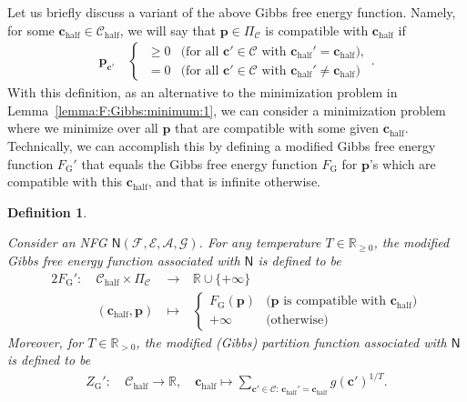 \documentclass[journal, twocolumn]{IEEEtran}
\renewcommand{\mathbf}[1]{{\bm{#1}}}
\renewcommand{\geq}{\geqslant}
\newcommand{\R}{\mathbb{R}}
\newcommand{\Rp}{\mathbb{R}_{\geq 0}}
\newcommand{\Rpp}{\mathbb{R}_{>0}}
\newcommand{\vect}[1]{\mathbf{#1}}
\newcommand{\code}[1]{\mathcal{#1}}
\newcommand{\set}[1]{\mathcal{#1}}
\newcommand{\graph}[1]{\mathsf{#1}}
\newcommand{\codeC}{\code{C}}
\newcommand{\codeCedge}{\code{C}}
\newcommand{\codeCedgehalf}{\code{C}_{\mathrm{half}}}
\newcommand{\setA}{\set{A}}
\newcommand{\setC}{\set{C}}
\newcommand{\setE}{\set{E}}
\newcommand{\setF}{\set{F}}
\newcommand{\setG}{\set{G}}
\newcommand{\vc}{\vect{c}}
\newcommand{\vchalf}{\vc_{\mathrm{half}}}
\newcommand{\vp}{\vect{p}}
\newcommand{\graphN}{\graph{N}}
\newcommand{\?}{\mathrm{?}}
\newcommand{\FGibbs}{F_{\mathrm{G}}}
\newcommand{\ZGibbs}{Z_{\mathrm{G}}}
\newcommand{\setPi}{\Pi}
\newtheorem{Definition}[Lemma]{Definition}
\begin{document}
Let us briefly discuss a variant of the above Gibbs free energy
function. Namely, for some $\vchalf \in \codeCedgehalf$, we will say that $\vp
\in \setPi_{\codeCedge}$ is compatible with $\vchalf$ if
\begin{align*}
  \vp_{\vc'} \
    &\begin{cases}
       \ \geq 0
         & \text{(for all $\vc' \in \codeCedge$ with $\vchalf' = \vchalf$)}, \\
       \ = 0
       & \text{(for all $\vc' \in \codeCedge$ with $\vchalf' \neq \vchalf$)}
     \end{cases}.
\end{align*}
With this definition, as an alternative to the minimization problem
in Lemma~\ref{lemma:F:Gibbs:minimum:1}, we can consider a minimization problem
where we minimize over all $\vp$ that are compatible with some given
$\vchalf$. Technically, we can accomplish this by defining a modified Gibbs
free energy function $\FGibbs'$ that equals the Gibbs free energy function
$\FGibbs$ for $\vp$'s which are compatible with this $\vchalf$, and that is
infinite otherwise.



\begin{Definition}
  \label{def:F:Gibbs:2}

  Consider an NFG $\graphN(\setF,\setE, \setA, \setG)$. For any temperature $T
  \in \Rp$, the modified Gibbs free energy function associated with $\graphN$
  is defined to be
  \begin{alignat*}{2}
    \FGibbs': \
      &\codeCedgehalf \times \setPi_{\setC}
      & \ \to \
      & \R  \cup \{ +\infty \} \\ 
      &(\vchalf, \vp)
      & \ \mapsto \ 
      &\begin{cases}
         \FGibbs(\vp) & \text{($\vp$ is compatible with $\vchalf$)} \\
         +\infty      & \text{(otherwise)}
       \end{cases}
  \end{alignat*}
  Moreover, for $T \in \Rpp$, the modified (Gibbs) partition function
  associated with $\graphN$ is defined to be
  \begin{align*}
    \ZGibbs': \ 
      &\codeCedgehalf
       \to
       \R, \quad
    \vchalf
       \mapsto\sum_{\vc' \in \codeC: \, \vchalf' = \vchalf}
         g(\vc')^{1/T}.
  \end{align*}
\end{Definition}
\end{document}
